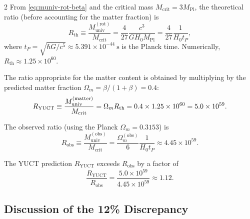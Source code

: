 \documentclass[12pt,a4paper]{article}
\begin{document}
\begin{multicols}{2}
		From \eqref{eq:muniv-rot-beta} and the critical mass \(M_{\mathrm{crit}} = 3 M_{\mathrm{Pl}}\), the theoretical ratio (before accounting for the matter fraction) is
		\begin{equation}
			R_{\mathrm{th}} \equiv \frac{M_{\mathrm{univ}}^{\mathrm{(rot)}}}{M_{\mathrm{crit}}} = \frac{4}{27} \frac{c^3}{G H_0 M_{\mathrm{Pl}}} = \frac{4}{27} \frac{1}{H_0 t_P},
			\label{eq:Rth}
		\end{equation}
		where \(t_P = \sqrt{\hbar G / c^5} \approx 5.391\times 10^{-44}\ \mathrm{s}\) is the Planck time. Numerically, \(R_{\mathrm{th}} \approx 1.25\times 10^{60}\).
		
		The ratio appropriate for the matter content is obtained by multiplying by the predicted matter fraction \(\Omega_m = \beta/(1+\beta) = 0.4\):
		\begin{equation}
			\small
			R_{\mathrm{YUCT}} \equiv \frac{M_{\mathrm{univ}}^{\mathrm{(matter)}}}{M_{\mathrm{crit}}} = \Omega_m R_{\mathrm{th}} = 0.4 \times 1.25\times 10^{60} = 5.0\times 10^{59}.
			\label{eq:RYUCT}
		\end{equation}
		
		The observed ratio (using the Planck \(\Omega_m = 0.3153\)) is
		\begin{equation}
			R_{\mathrm{obs}} \equiv \frac{M_{\mathrm{univ}}^{\mathrm{(obs)}}}{M_{\mathrm{crit}}} = \frac{\Omega_m^{\mathrm{(obs)}}}{6} \frac{1}{H_0 t_P} \approx 4.45\times 10^{59}.
			\label{eq:Robs}
		\end{equation}
		
		The YUCT prediction \(R_{\mathrm{YUCT}}\) exceeds \(R_{\mathrm{obs}}\) by a factor of
		\[
		\frac{R_{\mathrm{YUCT}}}{R_{\mathrm{obs}}} = \frac{5.0\times 10^{59}}{4.45\times 10^{59}} \approx 1.12.
		\]
		
		\subsection{Discussion of the 12\% Discrepancy}
		

\end{multicols}
\end{document}
